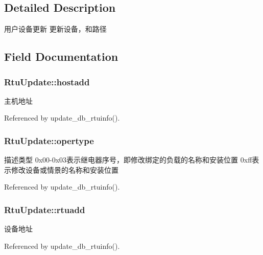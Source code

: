 \subsection{Detailed Description}
用户设备更新 更新设备，和路径 

\subsection{Field Documentation}
\hypertarget{structRtuUpdate_afd4ba90eecfa8e68b0d0acd6f287b7e8}{
\subsubsection[{hostadd}]{ Rtu\-Update\-::hostadd}}\label{structRtuUpdate_afd4ba90eecfa8e68b0d0acd6f287b7e8}


主机地址 



Referenced by update\-\_\-db\-\_\-rtuinfo().

\hypertarget{structRtuUpdate_ad0145b3406a72cf9cc8182f864ba35c6}{
\subsubsection[{opertype}]{ Rtu\-Update\-::opertype}}\label{structRtuUpdate_ad0145b3406a72cf9cc8182f864ba35c6}


描述类型 0x00-\/0x03表示继电器序号，即修改绑定的负载的名称和安装位置 0xff表示修改设备或情景的名称和安装位置 



Referenced by update\-\_\-db\-\_\-rtuinfo().

\hypertarget{structRtuUpdate_ac51fcd3ef3155b62e54803717d3c86d9}{
\subsubsection[{rtuadd}]{ Rtu\-Update\-::rtuadd}}\label{structRtuUpdate_ac51fcd3ef3155b62e54803717d3c86d9}


设备地址 



Referenced by update\-\_\-db\-\_\-rtuinfo().

